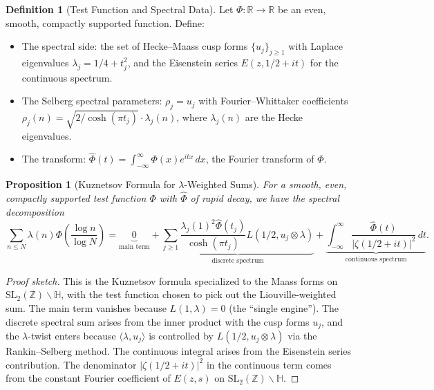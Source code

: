 \documentclass[11pt,a4paper]{article}
\theoremstyle{plain}
\newtheorem{proposition}[theorem]{Proposition}
\theoremstyle{definition}
\newtheorem{definition}[theorem]{Definition}
\newcommand{\SL}{\mathrm{SL}_2}
\begin{document}
\begin{definition}[Test Function and Spectral Data]
Let $\Phi: \mathbb{R} \to \mathbb{R}$ be an even, smooth, compactly supported function. Define:
\begin{itemize}
\item The spectral side: the set of Hecke--Maass cusp forms $\{u_j\}_{j \geq 1}$ with Laplace eigenvalues $\lambda_j = 1/4 + t_j^2$, and the Eisenstein series $E(z, 1/2 + it)$ for the continuous spectrum.
\item The Selberg spectral parameters: $\rho_j = u_j$ with Fourier--Whittaker coefficients $\rho_j(n) = \sqrt{2/\cosh(\pi t_j)} \cdot \lambda_j(n)$, where $\lambda_j(n)$ are the Hecke eigenvalues.
\item The transform: $\hat{\Phi}(t) = \int_{-\infty}^{\infty} \Phi(x) e^{itx}\, dx$, the Fourier transform of $\Phi$.
\end{itemize}
\end{definition}

\begin{proposition}[Kuznetsov Formula for $\lambda$-Weighted Sums]\label{prop:kuznetsov}
For a smooth, even, compactly supported test function $\Phi$ with $\hat{\Phi}$ of rapid decay, we have the spectral decomposition
\begin{equation}\label{eq:kuznetsov}
\sum_{n \leq N} \lambda(n) \Phi\!\left(\frac{\log n}{\log N}\right) = \underbrace{0}_{\text{main term}} + \underbrace{\sum_{j \geq 1} \frac{\lambda_j(1)^2 \hat{\Phi}(t_j)}{\cosh(\pi t_j)} L(1/2, u_j \otimes \lambda)}_{\text{discrete spectrum}} + \underbrace{\int_{-\infty}^{\infty} \frac{\hat{\Phi}(t)}{|\zeta(1/2+it)|^2}\, dt}_{\text{continuous spectrum}}.
\end{equation}
\end{proposition}

\begin{proof}[Proof sketch]
This is the Kuznetsov formula specialized to the Maass forms on $\SL(\mathbb{Z})\backslash \mathbb{H}$, with the test function chosen to pick out the Liouville-weighted sum. The main term vanishes because $L(1, \lambda) = 0$ (the ``single engine''). The discrete spectral sum arises from the inner product with the cusp forms $u_j$, and the $\lambda$-twist enters because $\langle \lambda, u_j \rangle$ is controlled by $L(1/2, u_j \otimes \lambda)$ via the Rankin--Selberg method. The continuous integral arises from the Eisenstein series contribution. The denominator $|\zeta(1/2+it)|^2$ in the continuous term comes from the constant Fourier coefficient of $E(z, s)$ on $\SL(\mathbb{Z})\backslash \mathbb{H}$.
\end{proof}
\end{document}

